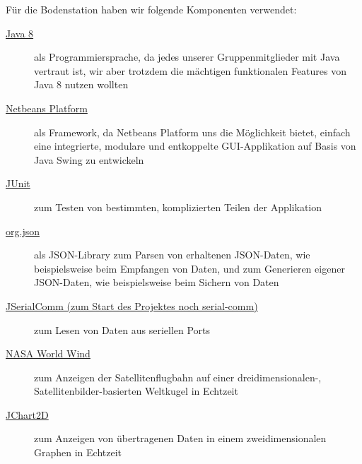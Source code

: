 Für die Bodenstation haben wir folgende Komponenten verwendet:
\begin{description}
	\item[\href{http://www.oracle.com/technetwork/java/javase/downloads/jdk8-downloads-2133151.html}{Java 8}] als Programmiersprache, da jedes unserer Gruppenmitglieder mit Java vertraut ist, wir aber trotzdem die mächtigen funktionalen Features von Java 8 nutzen wollten
	\item[\href{https://netbeans.org/features/platform/}{Netbeans Platform}] als Framework, da Netbeans Platform uns die Möglichkeit bietet, einfach eine integrierte, modulare und entkoppelte GUI-Applikation auf Basis von Java Swing zu entwickeln
	\item[\href{http://junit.org/}{JUnit}] zum Testen von bestimmten, komplizierten Teilen der Applikation
	\item[\href{http://www.json.org/java/}{org.json}] als JSON-Library zum Parsen von erhaltenen JSON-Daten, wie beispielsweise beim Empfangen von Daten, und zum Generieren eigener JSON-Daten, wie beispielsweise beim Sichern von Daten
	\item[\href{http://fazecast.github.io/jSerialComm/}{JSerialComm (zum Start des Projektes noch serial-comm)}] zum Lesen von Daten aus seriellen Ports
	\item[\href{http://worldwind.arc.nasa.gov/java/}{NASA World Wind}] zum Anzeigen der Satellitenflugbahn auf einer dreidimensionalen-, Satellitenbilder-basierten Weltkugel  in Echtzeit
	\item[\href{http://jchart2d.sourceforge.net/}{JChart2D}] zum Anzeigen von übertragenen Daten in einem zweidimensionalen Graphen in Echtzeit 
\end{description}